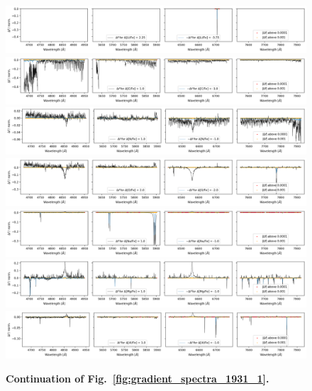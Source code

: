 \documentclass[
  journal=pasa,
  manuscript=research-paper, %
  year=2021,
  volume=37,
]{cup-journal}
\begin{document}
\begin{figure}[hbt!]
 \centering  
 \includegraphics[width=\textwidth]{figures/gradient_spectrum_1931_li_fe.png}
 \includegraphics[width=\textwidth]{figures/gradient_spectrum_1931_c_fe.png}
 \includegraphics[width=\textwidth]{figures/gradient_spectrum_1931_n_fe.png}
 \includegraphics[width=\textwidth]{figures/gradient_spectrum_1931_o_fe.png}
 \includegraphics[width=\textwidth]{figures/gradient_spectrum_1931_na_fe.png}
 \includegraphics[width=\textwidth]{figures/gradient_spectrum_1931_mg_fe.png}
 \includegraphics[width=\textwidth]{figures/gradient_spectrum_1931_al_fe.png}
 \caption{\textbf{Continuation of Fig.~\ref{fig:gradient_spectra_1931_1}.}} \label{fig:gradient_spectra_1931_2}
\end{figure}
\end{document}
